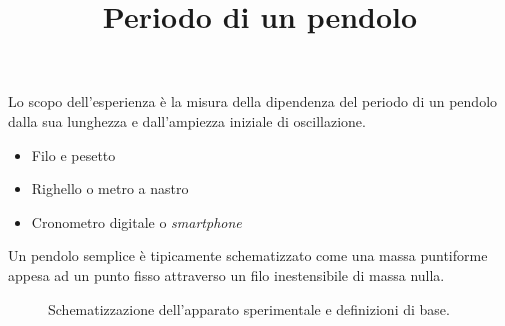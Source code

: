 \documentclass{lab1-article}
\title{Periodo di un pendolo}
\begin{document}
\begin{article}

\maketitle

\secintro
Lo scopo dell'esperienza \`e la misura della dipendenza del periodo di un
pendolo dalla sua lunghezza e dall'ampiezza iniziale di oscillazione.


\secmaterialsdad

\begin{itemize}
\item Filo e pesetto
\item Righello o metro a nastro
\item Cronometro digitale o \emph{smartphone}
\end{itemize}


\secdefinitions

Un pendolo semplice \`e tipicamente schematizzato come una massa puntiforme
appesa ad un punto fisso attraverso un filo inestensibile di massa nulla.

\begin{figure}[htb!]
  \caption{Schematizzazione dell'apparato sperimentale e definizioni di base.}
  \label{fig:pendolo}
\end{figure}


\end{article}
\end{document}
